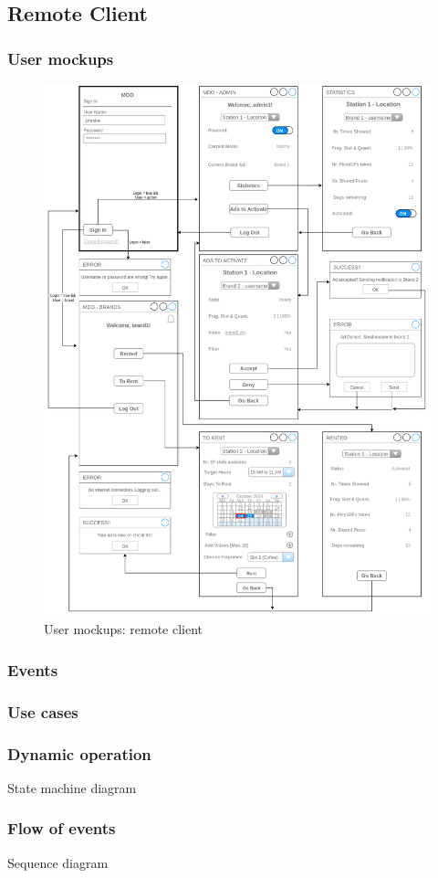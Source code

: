%
\subsection{Remote Client}
\label{sec:remote-cli-decomp}

\subsubsection{User mockups}
\label{sec:user-mockups-1}
\begin{figure}[htb!]
\centering
    \includegraphics[width=0.9\columnwidth]{./img/user-mockups-rc.png}
  \caption{User mockups: remote client}%
\label{fig:user-mockups-local}
\end{figure}

\subsubsection{Events}
\label{sec:events-1}

\subsubsection{Use cases}
\label{sec:use-cases-1}

\subsubsection{Dynamic operation}
\label{sec:dyn-oper-1}
State machine diagram

\subsubsection{Flow of events}
\label{sec:flow-events-1}
Sequence diagram

